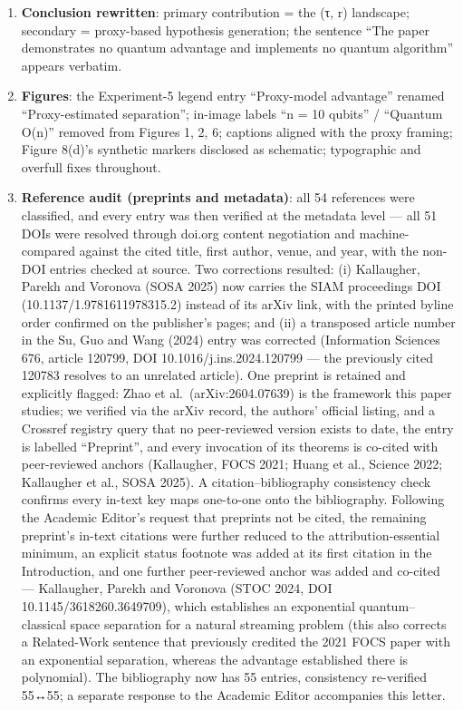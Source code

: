 \documentclass[
  11pt,
]{article}
\begin{document}
\begin{enumerate}
  \textbf{New ``Threats to Validity'' section} (construct / internal /
  external / statistical-conclusion) and a promoted, expanded
  \textbf{Future Work} section.
\item
  \textbf{Conclusion rewritten}: primary contribution = the (τ, r)
  landscape; secondary = proxy-based hypothesis generation; the sentence
  ``The paper demonstrates no quantum advantage and implements no
  quantum algorithm'' appears verbatim.
\item
  \textbf{Figures}: the Experiment-5 legend entry ``Proxy-model
  advantage'' renamed ``Proxy-estimated separation''; in-image labels
  ``n = 10 qubits'' / ``Quantum O(n)'' removed from Figures 1, 2, 6;
  captions aligned with the proxy framing; Figure 8(d)'s synthetic
  markers disclosed as schematic; typographic and overfull fixes
  throughout.
\item
  \textbf{Reference audit (preprints and metadata)}: all 54 references
  were classified, and every entry was then verified at the metadata
  level --- all 51 DOIs were resolved through doi.org content
  negotiation and machine-compared against the cited title, first
  author, venue, and year, with the non-DOI entries checked at source.
  Two corrections resulted: (i) Kallaugher, Parekh and Voronova (SOSA
  2025) now carries the SIAM proceedings DOI (10.1137/1.9781611978315.2)
  instead of its arXiv link, with the printed byline order confirmed on
  the publisher's pages; and (ii) a transposed article number in the Su,
  Guo and Wang (2024) entry was corrected (Information Sciences 676,
  article 120799, DOI 10.1016/j.ins.2024.120799 --- the previously cited
  120783 resolves to an unrelated article). One preprint is retained and
  explicitly flagged: Zhao et al.~(arXiv:2604.07639) is the framework
  this paper studies; we verified via the arXiv record, the authors'
  official listing, and a Crossref registry query that no peer-reviewed
  version exists to date, the entry is labelled ``Preprint'', and every
  invocation of its theorems is co-cited with peer-reviewed anchors
  (Kallaugher, FOCS 2021; Huang et al., Science 2022; Kallaugher et al.,
  SOSA 2025). A citation--bibliography consistency check confirms every
  in-text key maps one-to-one onto the bibliography. Following the
  Academic Editor's request that preprints not be cited, the remaining
  preprint's in-text citations were further reduced to the
  attribution-essential minimum, an explicit status footnote was added
  at its first citation in the Introduction, and one further
  peer-reviewed anchor was added and co-cited --- Kallaugher, Parekh and
  Voronova (STOC 2024, DOI 10.1145/3618260.3649709), which establishes
  an exponential quantum--classical space separation for a natural
  streaming problem (this also corrects a Related-Work sentence that
  previously credited the 2021 FOCS paper with an exponential
  separation, whereas the advantage established there is polynomial).
  The bibliography now has 55 entries, consistency re-verified 55↔55; a
  separate response to the Academic Editor accompanies this letter.
\end{enumerate}
\end{document}

